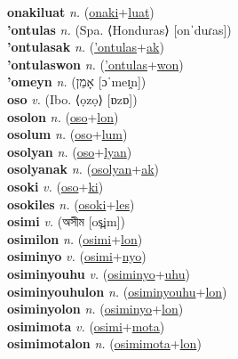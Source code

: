 \textbf{onakiluat} \textit{n.} (\hyperref[onaki]{onaki}+\hyperref[luat]{luat})
 \label{onakiluat} \\
\textbf{'ontulas} \textit{n.} (Spa. ⟨Honduras⟩ [onˈduɾas])
 \label{'ontulas} \\
\textbf{'ontulasak} \textit{n.} (\hyperref['ontulas]{'ontulas}+\hyperref[ak]{ak})
 \label{'ontulasak} \\
\textbf{'ontulaswon} \textit{n.} (\hyperref['ontulas]{'ontulas}+\hyperref[won]{won})
 \label{'ontulaswon} \\
\textbf{'omeyn} \textit{n.} ({\hebrew{}אָמֵן} [ɔˈmeɪ̯n])
 \label{'omeyn} \\
\textbf{oso} \textit{v.} (Ibo. ⟨ọzọ⟩ [ɒzɒ])
 \label{oso} \\
\textbf{osolon} \textit{n.} (\hyperref[oso]{oso}+\hyperref[lon]{lon})
 \label{osolon} \\
\textbf{osolum} \textit{n.} (\hyperref[oso]{oso}+\hyperref[lum]{lum})
 \label{osolum} \\
\textbf{osolyan} \textit{n.} (\hyperref[oso]{oso}+\hyperref[lyan]{lyan})
 \label{osolyan} \\
\textbf{osolyanak} \textit{n.} (\hyperref[osolyan]{osolyan}+\hyperref[ak]{ak})
 \label{osolyanak} \\
\textbf{osoki} \textit{v.} (\hyperref[oso]{oso}+\hyperref[ki]{ki})
 \label{osoki} \\
\textbf{osokiles} \textit{n.} (\hyperref[osoki]{osoki}+\hyperref[les]{les})
 \label{osokiles} \\
\textbf{osimi} \textit{v.} ({\bengali{}অসীম} [os̪im])
 \label{osimi} \\
\textbf{osimilon} \textit{n.} (\hyperref[osimi]{osimi}+\hyperref[lon]{lon})
 \label{osimilon} \\
\textbf{osiminyo} \textit{v.} (\hyperref[osimi]{osimi}+\hyperref[nyo]{nyo})
 \label{osiminyo} \\
\textbf{osiminyouhu} \textit{v.} (\hyperref[osiminyo]{osiminyo}+\hyperref[uhu]{uhu})
 \label{osiminyouhu} \\
\textbf{osiminyouhulon} \textit{n.} (\hyperref[osiminyouhu]{osiminyouhu}+\hyperref[lon]{lon})
 \label{osiminyouhulon} \\
\textbf{osiminyolon} \textit{n.} (\hyperref[osiminyo]{osiminyo}+\hyperref[lon]{lon})
 \label{osiminyolon} \\
\textbf{osimimota} \textit{v.} (\hyperref[osimi]{osimi}+\hyperref[mota]{mota})
 \label{osimimota} \\
\textbf{osimimotalon} \textit{n.} (\hyperref[osimimota]{osimimota}+\hyperref[lon]{lon})
